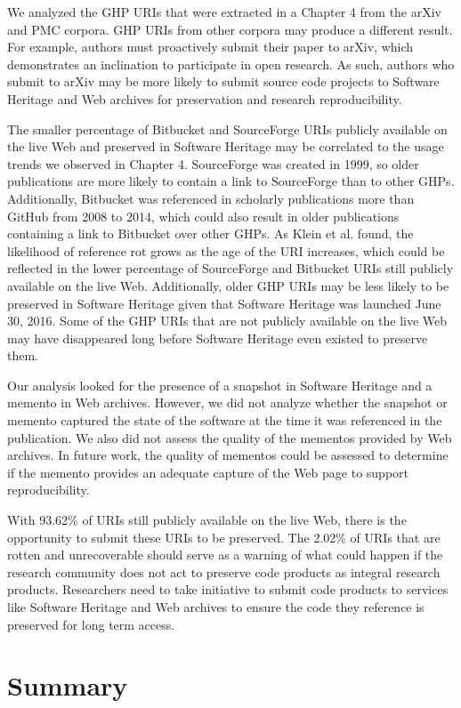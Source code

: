 We analyzed the GHP URIs that were extracted in a Chapter 4 from the arXiv and PMC corpora. GHP URIs from other corpora may produce a different result. For example, authors must proactively submit their paper to arXiv, which demonstrates an inclination to participate in open research. As such, authors who submit to arXiv may be more likely to submit source code projects to Software Heritage and Web archives for preservation and research reproducibility.

The smaller percentage of Bitbucket and SourceForge URIs publicly available on the live Web and preserved in Software Heritage may be correlated to the usage trends we observed in Chapter 4. SourceForge was created in 1999, so older publications are more likely to contain a link to SourceForge than to other GHPs. Additionally, Bitbucket was referenced in scholarly publications more than GitHub from 2008 to 2014, which could also result in older publications containing a link to Bitbucket over other GHPs. As Klein et al. found, the likelihood of reference rot grows as the age of the URI increases\cite{klein-plos2014}, which could be reflected in the lower percentage of SourceForge and Bitbucket URIs still publicly available on the live Web. Additionally, older GHP URIs may be less likely to be preserved in Software Heritage given that Software Heritage was launched June 30, 2016. Some of the GHP URIs that are not publicly available on the live Web may have disappeared long before Software Heritage even existed to preserve them. 

Our analysis looked for the presence of a snapshot in Software Heritage and a memento in Web archives. However, we did not analyze whether the snapshot or memento captured the state of the software at the time it was referenced in the publication. We also did not assess the quality of the mementos provided by Web archives. In future work, the quality of mementos could be assessed to determine if the memento provides an adequate capture of the Web page to support reproducibility. 

With 93.62\% of URIs still publicly available on the live Web, there is the opportunity to submit these URIs to be preserved. The 2.02\% of URIs that are rotten and unrecoverable should serve as a warning of what could happen if the research community does not act to preserve code products as integral research products. Researchers need to take initiative to submit code products to services like Software Heritage and Web archives to ensure the code they reference is preserved for long term access.

\section{Summary}